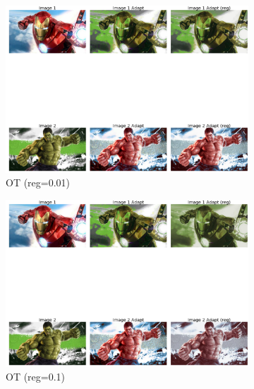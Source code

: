 \documentclass{article}
\begin{document}
\begin{figure}[h!]
     \centering
     \begin{subfigure}[b]{0.3\textwidth}
         \centering
         \includegraphics[width=\textwidth]{lab4/ot0.01-min.pdf}
         \caption{OT (reg=0.01)}
         \label{fig:ot0.01}
     \end{subfigure}
     \hfill
     \begin{subfigure}[b]{0.3\textwidth}
         \centering
         \includegraphics[width=\textwidth]{lab4/ot0.1-min.pdf}
         \caption{OT (reg=0.1)}
         \label{fig:ot0.1}
     \end{subfigure}
     \hfill
     \begin{subfigure}[b]{0.3\textwidth}
         \centering

\end{subfigure}
\end{figure}
\end{document}
